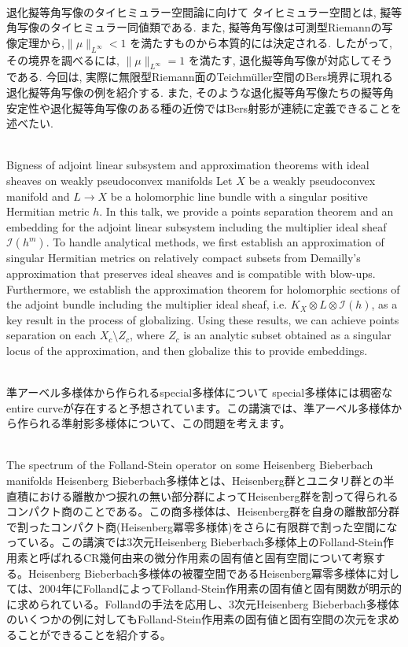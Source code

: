 \documentclass[dvipdfmx,a4paper,12pt]{article}
\theoremstyle{plain} %
\theoremstyle{definition} %
\begin{document}
\\
退化擬等角写像のタイヒミュラー空間論に向けて
\vskip3mm
タイヒミュラー空間とは, 擬等角写像のタイヒミュラー同値類である. また, 擬等角写像は可測型Riemannの写像定理から,$\| \mu \|_{L^\infty} < 1$ を満たすものから本質的には決定される. したがって, その境界を調べるには, $\| \mu \|_{L^\infty} = 1$ を満たす, 退化擬等角写像が対応してそうである. 今回は, 実際に無限型Riemann面のTeichmüller空間のBers境界に現れる退化擬等角写像の例を紹介する. また, そのような退化擬等角写像たちの擬等角安定性や退化擬等角写像のある種の近傍ではBers射影が連続に定義できることを述べたい. 
\vskip8mm

\\
Bigness of adjoint linear subsystem and approximation theorems with ideal sheaves on weakly pseudoconvex manifolds
\vskip3mm
Let $X$ be a weakly pseudoconvex manifold and $L\longrightarrow X$ be a holomorphic line bundle with a singular positive Hermitian metric $h$. In this talk, we provide a points separation theorem and an embedding for the adjoint linear subsystem including the multiplier ideal sheaf $\mathscr{I}(h^m)$. To handle analytical methods, we first establish an approximation of singular Hermitian metrics on relatively compact subsets from Demailly's approximation that preserves ideal sheaves and is compatible with blow-ups. 
Furthermore, we establish the approximation theorem for holomorphic sections of the adjoint bundle including the multiplier ideal sheaf, i.e. $K_X\otimes L\otimes\mathscr{I}(h)$, as a key result in the process of globalizing. Using these results, we can achieve points separation on each \(X_c\setminus Z_c\), where \(Z_c\) is an analytic subset obtained as a singular locus of the approximation, and then globalize this to provide embeddings. 
\vskip5mm

\newpage

\vskip5mm

\\
準アーベル多様体から作られるspecial多様体について
\vskip3mm
special多様体には稠密なentire curveが存在すると予想されています。この講演では、準アーベル多様体から作られる準射影多様体について、この問題を考えます。
\vskip8mm


\\
The spectrum of the Folland-Stein operator on some Heisenberg Bieberbach manifolds
\vskip3mm
Heisenberg Bieberbach多様体とは、Heisenberg群とユニタリ群との半直積における離散かつ捩れの無い部分群によってHeisenberg群を割って得られるコンパクト商のことである。この商多様体は、Heisenberg群を自身の離散部分群で割ったコンパクト商(Heisenberg冪零多様体)をさらに有限群で割った空間になっている。この講演では3次元Heisenberg Bieberbach多様体上のFolland-Stein作用素と呼ばれるCR幾何由来の微分作用素の固有値と固有空間について考察する。Heisenberg Bieberbach多様体の被覆空間であるHeisenberg冪零多様体に対しては、2004年にFollandによってFolland-Stein作用素の固有値と固有関数が明示的に求められている。Follandの手法を応用し、3次元Heisenberg Bieberbach多様体のいくつかの例に対してもFolland-Stein作用素の固有値と固有空間の次元を求めることができることを紹介する。
\vskip8mm
\end{document}
